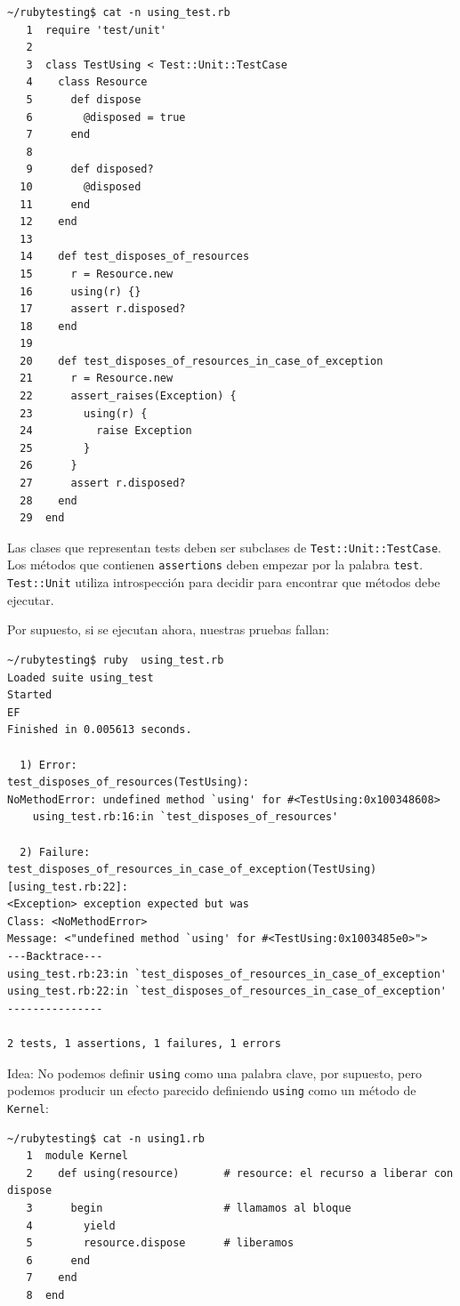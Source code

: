\begin{verbatim}
~/rubytesting$ cat -n using_test.rb 
   1  require 'test/unit'
   2  
   3  class TestUsing < Test::Unit::TestCase
   4    class Resource
   5      def dispose
   6        @disposed = true
   7      end
   8  
   9      def disposed?
  10        @disposed
  11      end
  12    end
  13  
  14    def test_disposes_of_resources
  15      r = Resource.new
  16      using(r) {}
  17      assert r.disposed?
  18    end
  19    
  20    def test_disposes_of_resources_in_case_of_exception
  21      r = Resource.new
  22      assert_raises(Exception) {
  23        using(r) {
  24          raise Exception
  25        }
  26      }
  27      assert r.disposed?
  28    end
  29  end
\end{verbatim}


Las clases que representan tests deben ser subclases de 
\verb|Test::Unit::TestCase|. 
Los métodos que contienen \verb|assertions| deben empezar por la palabra \verb|test|.
\verb|Test::Unit| utiliza introspección para decidir para encontrar que métodos debe ejecutar.

Por supuesto, si se ejecutan ahora, nuestras pruebas fallan:
\begin{verbatim}
~/rubytesting$ ruby  using_test.rb 
Loaded suite using_test
Started
EF
Finished in 0.005613 seconds.

  1) Error:
test_disposes_of_resources(TestUsing):
NoMethodError: undefined method `using' for #<TestUsing:0x100348608>
    using_test.rb:16:in `test_disposes_of_resources'

  2) Failure:
test_disposes_of_resources_in_case_of_exception(TestUsing) [using_test.rb:22]:
<Exception> exception expected but was
Class: <NoMethodError>
Message: <"undefined method `using' for #<TestUsing:0x1003485e0>">
---Backtrace---
using_test.rb:23:in `test_disposes_of_resources_in_case_of_exception'
using_test.rb:22:in `test_disposes_of_resources_in_case_of_exception'
---------------

2 tests, 1 assertions, 1 failures, 1 errors

\end{verbatim}
Idea: No podemos definir \verb|using| como una palabra clave, por supuesto, pero podemos 
producir un efecto parecido definiendo \verb|using| como un método de \verb|Kernel|:
\begin{verbatim}
~/rubytesting$ cat -n using1.rb 
   1  module Kernel
   2    def using(resource)       # resource: el recurso a liberar con dispose
   3      begin                   # llamamos al bloque 
   4        yield
   5        resource.dispose      # liberamos
   6      end
   7    end
   8  end
\end{verbatim}


